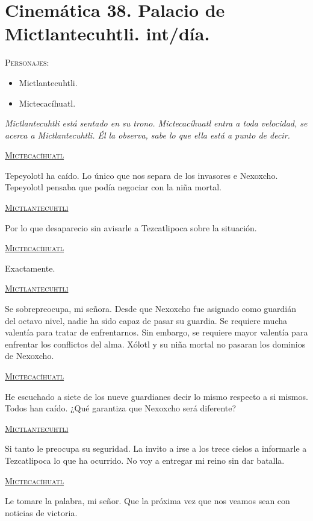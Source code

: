 \documentclass[11pt,letterpaper]{article}
\begin{document}
\section{Cinemática 38. Palacio de Mictlantecuhtli. int/día.}
 \textsc{Personajes}:
 \begin{itemize}
 \item Mictlantecuhtli.
 \item Mictecacíhuatl.

 \end{itemize}
\textit{Mictlantecuhtli está sentado en su trono. Mictecacíhuatl entra a toda velocidad, se acerca a Mictlantecuhtli. Él la observa, sabe lo que ella está a punto de decir.}
\begin{center}
\textsc{\underline{Mictecacíhuatl}}
\\
\par
Tepeyolotl ha caído. Lo único que nos separa de los invasores e Nexoxcho. Tepeyolotl pensaba que podía negociar con la niña mortal.
\\
\par
\textsc{\underline{Mictlantecuhtli}}
\\
\par
Por lo que desaparecio sin avisarle a Tezcatlipoca sobre la situación. 
\\
\par
\textsc{\underline{Mictecacíhuatl}}
\\
\par
Exactamente.
\\
\par
\textsc{\underline{Mictlantecuhtli}}
\\
\par
Se sobrepreocupa, mi señora. Desde que Nexoxcho fue asignado como guardián del octavo nivel, nadie ha sido capaz de pasar su guardia. Se requiere mucha valentía para tratar de enfrentarnos. Sin embargo, se requiere mayor valentía para enfrentar los conflictos del alma. Xólotl y su niña mortal no pasaran los dominios de Nexoxcho.
\\
\par
\textsc{\underline{Mictecacíhuatl}}
\\
\par
He escuchado a siete de los nueve guardianes decir lo mismo respecto a si mismos. Todos han caído. ¿Qué garantiza que Nexoxcho será diferente?
\\
\par
\textsc{\underline{Mictlantecuhtli}}
\\
\par
Si tanto le preocupa su seguridad. La invito a irse a los trece cielos a informarle a Tezcatlipoca lo que ha ocurrido. No voy a entregar mi reino sin dar batalla.
\\
\par
\textsc{\underline{Mictecacíhuatl}}
\\
\par
Le tomare la palabra, mi señor. Que la próxima vez que nos veamos sean con noticias de victoria.
\end{center}
\end{document}
